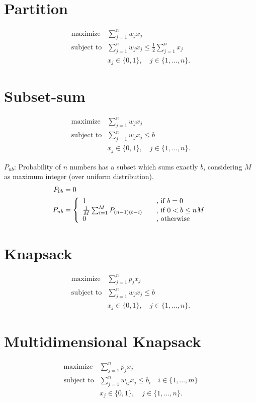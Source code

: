 \documentclass{article}
\title{}
\author{Marcos Daniel Baroni}
\begin{document}
\section{Partition}
\begin{align*}
  \text{maximize} & \sum_{j=1}^n w_j x_j \\
  \text{subject to} & \sum_{j=1}^n w_j x_j \leq \frac{1}{2} \sum_{j=1}^n x_j \\
   & x_j \in \{0, 1\}, \quad j \in \{1, \ldots, n\}.
\end{align*}

\section{Subset-sum}
\begin{align*}
  \text{maximize} & \sum_{j=1}^n w_j x_j \\
  \text{subject to} & \sum_{j=1}^n w_j x_j \leq b\\
   & x_j \in \{0, 1\}, \quad j \in \{1, \ldots, n\}.
\end{align*}

$P_{nb}$: Probability of $n$ numbers has a subset which sums exactly $b$,
considering $M$ as maximum integer (over uniform distribution).
\begin{align*}
  P_{0b} &= 0 \\
  P_{nb} &= \left\{
    \begin{array}{l l}
      1 & \quad \text{, if $b = 0$}\\
      \frac{1}{M} \sum_{i=1}^M P_{(n-1)(b-i)} & \quad \text{, if $0 < b \leq nM$}\\
      0 & \quad \text{, otherwise}
    \end{array}
  \right.
\end{align*}

\section{Knapsack}
\begin{align*}
  \text{maximize} & \sum_{j=1}^n p_j x_j \\
  \text{subject to} & \sum_{j=1}^n w_j x_j \leq b\\
   & x_j \in \{0, 1\}, \quad j \in \{1, \ldots, n\}.
\end{align*}

\section{Multidimensional Knapsack}
\begin{align*}
  \text{maximize} & \sum_{j=1}^n p_j x_j \\
  \text{subject to} & \sum_{j=1}^n w_{ij} x_j \leq b_i \quad i \in \{1, \ldots, m\}\\
   & x_j \in \{0, 1\}, \quad j \in \{1, \ldots, n\}.
\end{align*}

%
%
\end{document}
